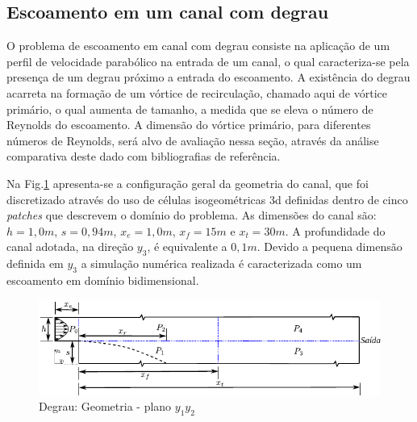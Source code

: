 \documentclass[tese_patricia]{subfiles}
\begin{document}
\subsection {Escoamento em um canal com degrau}

O problema de escoamento em canal com degrau consiste na aplicação de um perfil de velocidade parabólico na entrada de um canal, o qual caracteriza-se pela presença de um degrau próximo a entrada do escoamento. A existência do degrau acarreta na formação de um vórtice de recirculação, chamado aqui de vórtice primário, o qual aumenta de tamanho, a medida que se eleva o número de Reynolds do escoamento. A dimensão do vórtice primário, para diferentes números de Reynolds, será alvo de avaliação nessa seção, através da análise comparativa deste dado com bibliografias de referência.

Na Fig.\ref{fig:degrau_geometria} apresenta-se a configuração geral da geometria do canal, que foi discretizado através do uso de células isogeométricas 3d definidas dentro de cinco \textit{patches} que descrevem o domínio do problema. As dimensões do canal são: $h = 1,0m$, $s = 0,94m$, $x_{e}= 1,0m$, $x_{f}= 15m$ e $x_{t} = 30m$. A profundidade do canal adotada, na direção $y_3$, é equivalente a $0,1m$. Devido a pequena dimensão definida em $y_3$ a simulação numérica realizada é caracterizada como um escoamento em domínio bidimensional.

\begin{figure}[htb!]
	\centering
	\includegraphics[scale=1.2,trim=0cm 0cm 0cm 0cm, clip=true]{Imagens/Cap3/degrau_geometria.pdf}
	\caption{Degrau: Geometria - plano $y_1$$y_2$}
	\label{fig:degrau_geometria}
\end{figure}
\end{document}
